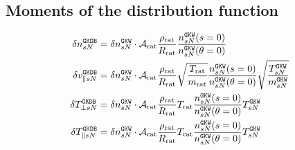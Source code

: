 \documentclass[a4paper]{report}
\begin{document}
\subsection{Moments of the distribution function}
\begin{align}
\delta n_{sN}^{\texttt{GKDB}} & = \delta n_{sN}^{\texttt{GKW}} \cdot \mathcal{A}_\textrm{rat}  \frac{\rho_\textrm{rat}}{R_\textrm{rat}}\frac{n_{sN}^{\texttt{GKW}}(s=0)}{n_{sN}^{\texttt{GKW}}(\theta=0)} \\
\delta v_{\parallel sN}^{\texttt{GKDB}} & =  \delta n_{sN}^{\texttt{GKW}}\cdot \mathcal{A}_\textrm{rat}  \frac{\rho_\textrm{rat}}{R_\textrm{rat}}\sqrt{\frac{T_\textrm{rat}}{m_\textrm{rat}}} \frac{n_{sN}^{\texttt{GKW}}(s=0)}{n_{sN}^{\texttt{GKW}}(\theta=0)}\sqrt{\frac{T_{sN}^{\texttt{GKW}} }{m_{sN}^{\texttt{GKW}} }}\\
\delta T_{\perp sN}^{\texttt{GKDB}} & =  \delta n_{sN}^{\texttt{GKW}}\cdot \mathcal{A}_\textrm{rat}  \frac{\rho_\textrm{rat}}{R_\textrm{rat}}T_\textrm{rat}\frac{n_{sN}^{\texttt{GKW}}(s=0)}{n_{sN}^{\texttt{GKW}}(\theta=0)}T_{sN}^{\texttt{GKW}}\\
\delta T_{\parallel sN}^{\texttt{GKDB}} & =  \delta n_{sN}^{\texttt{GKW}}\cdot \mathcal{A}_\textrm{rat}  \frac{\rho_\textrm{rat}}{R_\textrm{rat}}T_\textrm{rat}\frac{n_{sN}^{\texttt{GKW}}(s=0)}{n_{sN}^{\texttt{GKW}}(\theta=0)}T_{sN}^{\texttt{GKW}}
\end{align}



\end{document}
